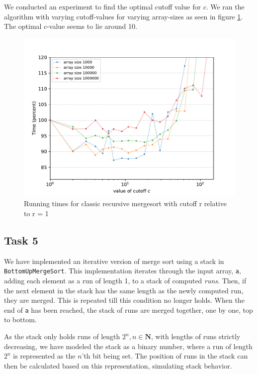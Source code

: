 \documentclass[11pt, a4paper]{article}
\begin{document}
We conducted an experiment to find the optimal cutoff value for $c$. We ran the algorithm with varying cutoff-values for varying array-sizes as seen in figure \ref{fig:runtimes}. The optimal $c$-value seems to lie around 10.

\begin{figure}[h]
  \begin{center}
    \includegraphics[width=\textwidth]{plot/t4p1.pdf}
    \caption{Running times for classic recursive mergesort with cutoff r relative to r = 1}
    \label{fig:runtimes}
  \end{center}
\end{figure}

\subsection{Task 5}

We have implemented an iterative version of merge sort using a stack in \verb|BottomUpMergeSort|. This implementation iterates through the input array, \verb|a|, adding each element as a run of length 1, to a stack of computed \textit{runs}. Then, if the next element in the stack has the same length as the newly computed run, they are merged. This is repeated till this condition no longer holds. 
When the end of \verb|a| has been reached, the stack of runs are merged together, one by one, top to bottom.

As the stack only holds runs of length $2^n, n\in \mathbf{N}$, with lengths of runs strictly decreasing, we have modeled the stack as a binary number, where a run of length $2^n$ is represented as the $n$'th bit being set. The position of runs in the stack can then be calculated based on this representation, simulating stack behavior.
\end{document}
